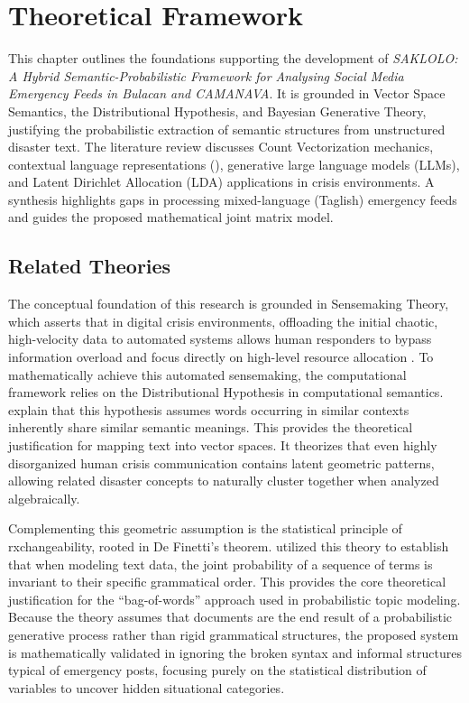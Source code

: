 \chapter{Theoretical Framework}

This chapter outlines the foundations supporting the development of
\emph{SAKLOLO: A Hybrid Semantic-Probabilistic Framework for Analysing Social
	Media Emergency Feeds in Bulacan and CAMANAVA}. It is grounded in Vector Space
Semantics, the Distributional Hypothesis, and Bayesian Generative Theory,
justifying the probabilistic extraction of semantic structures from
unstructured disaster text. The literature review discusses Count
Vectorization mechanics, contextual language representations (\xlmr),
generative large language models (LLMs), and Latent Dirichlet Allocation (LDA)
applications in crisis environments. A synthesis highlights gaps in processing
mixed-language (Taglish) emergency feeds and guides the proposed mathematical
joint matrix model.

\section*{Related Theories}

The conceptual foundation of this research is grounded in Sensemaking Theory,
which asserts that in digital crisis environments, offloading the initial
chaotic, high-velocity data to automated systems allows human responders to
bypass information overload and focus directly on high-level resource
allocation \parencite{pezanowski2022}. To mathematically achieve this automated
sensemaking, the computational framework relies on the Distributional Hypothesis
in computational semantics. \textcite{balkir2016} explain that this hypothesis
assumes words occurring in similar contexts inherently share similar semantic
meanings. This provides the theoretical justification for mapping text into
vector spaces. It theorizes that even highly disorganized human crisis
communication contains latent geometric patterns, allowing related disaster
concepts to naturally cluster together when analyzed algebraically.

Complementing this geometric assumption is the statistical principle of
rxchangeability, rooted in De Finetti's theorem. \textcite{blei2003} utilized
this theory to establish that when modeling text data, the joint probability of
a sequence of terms is invariant to their specific grammatical order. This
provides the core theoretical justification for the ``bag-of-words'' approach
used in probabilistic topic modeling. Because the theory assumes that documents
are the end result of a probabilistic generative process rather than rigid
grammatical structures, the proposed system is mathematically validated in
ignoring the broken syntax and informal structures typical of emergency posts,
focusing purely on the statistical distribution of variables to uncover hidden
situational categories.

